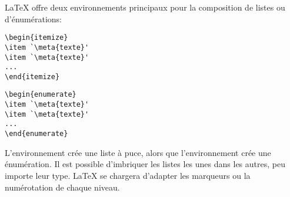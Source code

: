 {\LaTeX} offre deux environnements principaux pour la composition de
listes ou d'énumérations:
\begin{demo}
  \begin{minipage}{0.48\linewidth}
\begin{lstlisting}
\begin{itemize}
\item `\meta{texte}'
\item `\meta{texte}'
...
\end{itemize}
\end{lstlisting}
  \end{minipage}
  \hfill
  \begin{minipage}{0.48\linewidth}
\begin{lstlisting}
\begin{enumerate}
\item `\meta{texte}'
\item `\meta{texte}'
...
\end{enumerate}
\end{lstlisting}
  \end{minipage}
\end{demo}
L'environnement  crée une liste à puce, alors que
l'environnement  crée une énumération. Il est possible
d'imbriquer les listes les unes dans les autres, peu importe leur
type. {\LaTeX} se chargera d'adapter les marqueurs ou la numérotation
de chaque niveau.

